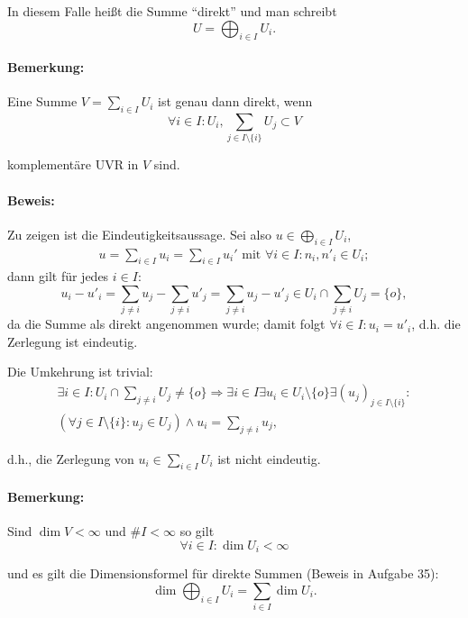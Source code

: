 	In diesem Falle heißt die Summe "`direkt"' und man schreibt
	\[ U = \bigoplus_{i\in I} U_i. \]
		
\paragraph{Bemerkung: }
	Eine Summe $ V = \sum_{i\in I} U_i $ ist genau dann direkt, wenn
		\begin{equation*}
		\forall i\in I: U_i, \sum_{j\in I\setminus\{i\}}U_j \subset V
		\end{equation*}
		
	komplementäre UVR in $ V $ sind.

\paragraph{Beweis: }
	Zu zeigen ist die Eindeutigkeitsaussage. Sei also $ u \in \bigoplus_{i\in I}U_i $,
		\begin{gather*}
		u = \sum_{i\in I} u_i = \sum_{i\in I} u_i' \text{ mit } \forall i\in I: n_i,n'_i\in U_i;
		\end{gather*}
	dann gilt für jedes $ i\in I$:
		\begin{equation*}
		u_i-u'_i = \sum _{j\neq i}u_j-\sum_{j\neq i} u'_j = \sum_{j\neq i}u_j-u'_j \in U_i\cap \sum_{j\neq i} U_j = \{o\},
		\end{equation*}
	da die Summe als direkt angenommen wurde; damit folgt $ \forall i \in I: u_i = u'_i $, d.h. die Zerlegung ist eindeutig.
	
	Die Umkehrung ist trivial:
		\begin{gather*}
		\exists i\in I:U_i\cap \sum_{j\neq i} U_j \neq \{o\} \Rightarrow \exists i\in I\exists u_i\in U_i\setminus\{o\}\exists (u_j)_{j\in I\setminus\{i\}}:\\
		(\forall j\in I\setminus\{i\}:u_j \in U_j)\land u_i = \sum_{j\neq i} u_j,
		\end{gather*}
		
	d.h., die Zerlegung von $ u_i\in \sum_{i\in I}U_i $ ist nicht eindeutig.

\paragraph{Bemerkung: }
	Sind $ \dim V <\infty $ und $ \# I < \infty $ so gilt
		\begin{equation*}
		\forall i\in I: \dim U_i < \infty
		\end{equation*}
		
	und es gilt die Dimensionsformel für direkte Summen (Beweis in Aufgabe 35):
		\begin{equation*}
		\dim \bigoplus_{i\in I}U_i = \sum_{i\in I} \dim U_i.
		\end{equation*}
	
